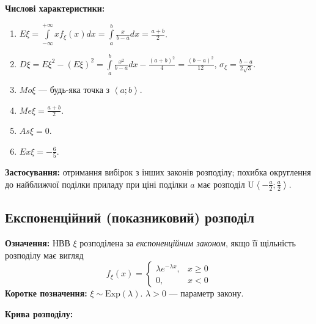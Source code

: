 \noindent\textbf{Числові характеристики:}
\begin{enumerate}
    \item $E\xi = \int\limits_{-\infty}^{+\infty} x f_\xi(x)dx = \int\limits_{a}^{b} \frac{x}{b-a}dx = \frac{a+b}{2}$.
    \item $D\xi = E\xi^2 - (E\xi)^2 = \int\limits_{a}^{b} \frac{x^2}{b-a}dx - \frac{(a+b)^2}{4} = \frac{(b-a)^2}{12}$, $\sigma_\xi = \frac{b-a}{2\sqrt{3}}$.
    \item ${Mo}\xi$ --- будь-яка точка з $\left<a; b\right>$.
    \item ${Me}\xi = \frac{a+b}{2}$.
    \item ${As}\xi = 0$.
    \item ${Ex}\xi = -\frac{6}{5}$.
\end{enumerate}

\noindent\textbf{Застосування:} отримання вибірок з інших законів розподілу;
похибка округлення до найближчої поділки приладу при ціні поділки $a$ має розподіл $\mathrm{U}\left<-\frac{a}{2}; \frac{a}{2}\right>$.

\subsection{Експоненційний (показниковий) розподіл}
\noindent\textbf{Означення:}
    НВВ $\xi$ розподілена за \emph{експоненційним законом}, 
    якщо її щільність розподілу має вигляд \begin{equation}
        f_\xi(x) = \begin{cases}
            \lambda e^{-\lambda x}, & x \geq 0 \\
            0, & x < 0
        \end{cases}
    \end{equation}
\textbf{Коротке позначення:} $\xi \sim \mathrm{Exp}(\lambda)$.
    $\lambda > 0$ --- параметр закону.

\noindent \textbf{Крива розподілу:}


